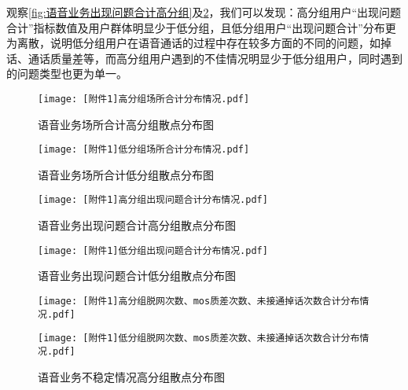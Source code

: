 \documentclass{MathorCupmodeling}
\begin{document}
\begin{itemize}
\begin{itemize}
			观察\textcolor{blue}{\cref{fig:语音业务出现问题合计高分组}}及\textcolor{blue}{\cref{fig:语音业务出现问题合计低分组}}，我们可以发现：高分组用户“出现问题合计”指标数值及用户群体明显少于低分组，且低分组用户“出现问题合计”分布更为离散，说明低分组用户在语音通话的过程中存在较多方面的不同的问题，如掉话、通话质量差等，而高分组用户遇到的不佳情况明显少于低分组用户，同时遇到的问题类型也更为单一。
			\begin{figure}[htbp]
				\centering
				\begin{minipage}{0.48\linewidth}
					\centering
					\texttt{[image: [附件1]高分组场所合计分布情况.pdf]}
					\caption{语音业务场所合计高分组散点分布图}
					\label{fig:语音业务场所合计高分组}
				\end{minipage}
				\begin{minipage}{0.48\linewidth}
					\centering
					\texttt{[image: [附件1]低分组场所合计分布情况.pdf]}
					\caption{语音业务场所合计低分组散点分布图}
					\label{fig:语音业务场所合计低分组}
				\end{minipage}
			\end{figure}
			\begin{figure}[htbp]
				\centering
				\begin{minipage}{0.48\linewidth}
					\centering
					\texttt{[image: [附件1]高分组出现问题合计分布情况.pdf]}
					\caption{语音业务出现问题合计高分组散点分布图}
					\label{fig:语音业务出现问题合计高分组}
				\end{minipage}
				\begin{minipage}{0.48\linewidth}
					\centering
					\texttt{[image: [附件1]低分组出现问题合计分布情况.pdf]}
					\caption{语音业务出现问题合计低分组散点分布图}
					\label{fig:语音业务出现问题合计低分组}
				\end{minipage}
			\end{figure}
			\begin{figure}[H]
				\centering
				\begin{minipage}{0.48\linewidth}
					\centering
					\texttt{[image: [附件1]高分组脱网次数、mos质差次数、未接通掉话次数合计分布情况.pdf]}
					\caption{语音业务不稳定情况高分组散点分布图}
					\label{fig:语音业务脱网次数、mos质差次数、未接通掉话次数合计高分组}
				\end{minipage}
				\begin{minipage}{0.48\linewidth}
					\centering
					\texttt{[image: [附件1]低分组脱网次数、mos质差次数、未接通掉话次数合计分布情况.pdf]}

\end{minipage}
\end{figure}
\end{itemize}
\end{itemize}
\end{document}
